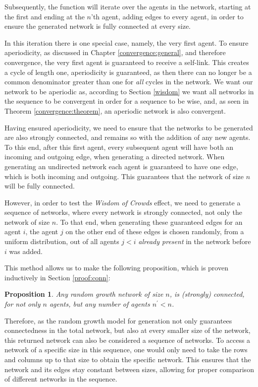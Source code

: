 \documentclass[a4paper, 12pt]{report}
\newtheorem{prop}{Proposition}
\begin{document}
Subsequently, the function will iterate over the agents in the network, starting at the first and ending at the $n$'th agent, adding edges to every agent, in order to ensure the generated network is fully connected at every size. 

In this iteration there is one special case, namely, the very first agent. To ensure aperiodicity, as discussed in Chapter \ref{convergence:general}, and therefore convergence, the very first agent is guaranteed to receive a self-link. This creates a cycle of length one, aperiodicity is guaranteed, as then there can no longer be a common denominator greater than one for \emph{all} cycles in the network. We want our network to be aperiodic as, according to Section \ref{wisdom} we want all networks in the sequence to be convergent in order for a sequence to be wise, and, as seen in Theorem \ref{convergence:theorem}, an aperiodic network is also convergent.

Having ensured aperiodicity, we need to ensure that the networks to be generated are also strongly connected, and remains so with the addition of any new agents. To this end, after this first agent, every subsequent agent will have both an incoming and outgoing edge, when generating a directed network. When generating an undirected network each agent is guaranteed to have one edge, which is both incoming and outgoing. This guarantees that the network of size $n$ will be fully connected. 

However, in order to test the \emph{Wisdom of Crowds} effect, we need to generate a sequence of networks, where every network is strongly connected, not only the network of size $n$. To that end, when generating these guaranteed edges for an agent $i$, the agent $j$ on the other end of these edges is chosen randomly, from a uniform distribution, out of all agents $j < i$ \emph{already present} in the network before $i$ was added. 

This method allows us to make the following proposition, which is proven inductively in Section \ref{proof:conn}:
\begin{prop}
\label{prop:conn}
Any \emph{random growth} network of size $n$, is (strongly) connected, for not only $n$ agents, but any number of agents $n^{\prime} < n$.
\end{prop}

Therefore, as the random growth model for generation not only guarantees connectedness in the total network, but also at every smaller size of the network, this returned network can also be considered a sequence of networks. To access a network of a specific size in this sequence, one would only need to take the rows and columns up to that size to obtain the specific network. This ensures that the network and its edges stay constant between sizes, allowing for proper comparison of different networks in the sequence. 
\end{document}
